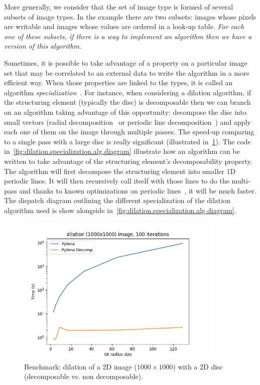 More generally, we consider that the set of image type is formed of several subsets of image types. In the example there
are two subsets: images whose pixels are writable and images whose values are ordered in a look-up table. \emph{For each
  one of these subsets, if there is a way to implement an algorithm then we have a \emph{version} of this algorithm}.

Sometimes, it is possible to take advantage of a property on a particular image set that may be correlated to an
external data to write the algorithm in a more efficient way. When those properties are linked to the types, it is
called an algorithm \emph{specialization}~\parencite{jarvi.2006.specialization-article}. For instance, when considering
a dilation algorithm, if the structuring element (typically the disc) is decomposable then we can branch on an algorithm
taking advantage of this opportunity: decompose the disc into small vectors (radial
decomposition~\parencite{adams.1993.radialdecomp} or periodic line decomposition~\parencite{jones.1996.periodiclines})
and apply each one of them on the image through multiple passes. The speed-up comparing to a single pass with a large
disc is really significant (illustrated in~\cref{fig:gen.bench.disc.decomp.vs.nodecomp}). The code
in~\cref{fig:dilation.specialization.alg.diagram} illustrate how an algorithm can be written to take advantage of the
structuring element's decomposability property. The algorithm will first decompose the structuring element into smaller
1D periodic lines. It will then recursively call itself with those lines to do the multi-pass and thanks to known
optimizations on periodic lines~\parencite{vanherk.1992.localminmax}, it will be much faster. The dispatch diagram
outlining the different specialization of the dilation algorithm used is show alongside
in~\cref{fig:dilation.specialization.alg.diagram}.

\begin{figure}[htb]
  \centering
  \includegraphics[width=3.8in]{../figures/DilationPln_SEDisc_Benchmarks__Time_vs_SE_size}
  \caption{Benchmark: dilation of a 2D image (\(1000 \times 1000\)) with a 2D disc (decomposable vs. non decomposable).}
  \label{fig:gen.bench.disc.decomp.vs.nodecomp}
\end{figure}


